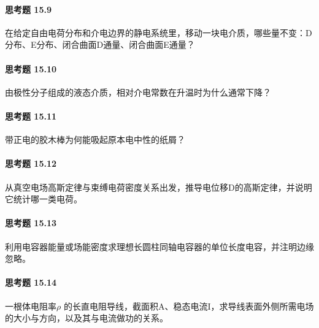 \paragraph{思考题 15.9}
在给定自由电荷分布和介电边界的静电系统里，移动一块电介质，哪些量不变：D分布、E分布、闭合曲面D通量、闭合曲面E通量？

\paragraph{思考题 15.10}
由极性分子组成的液态介质，相对介电常数在升温时为什么通常下降？

\paragraph{思考题 15.11}
带正电的胶木棒为何能吸起原本电中性的纸屑？

\paragraph{思考题 15.12}
从真空电场高斯定律与束缚电荷密度关系出发，推导电位移D的高斯定律，并说明它统计哪一类电荷。

\paragraph{思考题 15.13}
利用电容器能量或场能密度求理想长圆柱同轴电容器的单位长度电容，并注明边缘忽略。

\paragraph{思考题 15.14}
一根体电阻率\(\rho\) 的长直电阻导线，截面积A、稳态电流I，求导线表面外侧所需电场的大小与方向，以及其与电流做功的关系。
